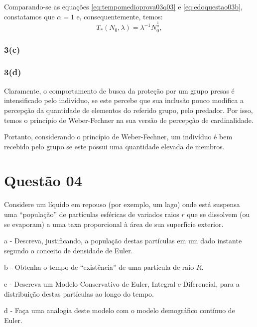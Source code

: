 Comparando-se as equações \eqref{eq:tempomedioprova03q03} e \eqref{eq:edoquestao03b}, constatamos que \(\alpha = 1\) e, consequentemente, temos:
\begin{equation}\label{eq:tempomedioprova03q03completa}
T_\ast(N_0,\lambda) = \lambda^{-1} N_0^{\frac{1}{3}},    
\end{equation}






\subsection*{3(c)}

\subsection*{3(d)}

Claramente, o comportamento de busca da proteção por um grupo presas é intensificado pelo indivíduo, se este percebe que sua inclusão pouco modifica a percepção da quantidade de elementos do referido grupo, pelo predador. Por isso, temos o princípio de Weber-Fechner na sua versão de percepção de cardinalidade.

Portanto, considerando o princípio de Weber-Fechner, um indivíduo é bem recebido pelo grupo se este possui uma quantidade elevada de membros.





\clearpage
\chapter*{Questão 04}


Considere um líquido em repouso (por exemplo, um lago) onde está suspensa uma ``população'' de partículas esféricas de variados raios $r$ que se dissolvem (ou se evaporam) a uma taxa proporcional à área de sua superfície exterior.

\begin{description}
\item a - Descreva, justificando, a população destas partículas em um dado instante segundo o conceito de densidade de Euler.

\item b - Obtenha o tempo de ``existência'' de uma partícula de raio $R$.

\item c - Descreva um Modelo Conservativo de Euler, Integral e Diferencial, para a distribuição destas partículas ao longo do tempo.

\item d - Faça uma analogia deste modelo com o modelo demográfico contínuo de Euler.
\end{description}

